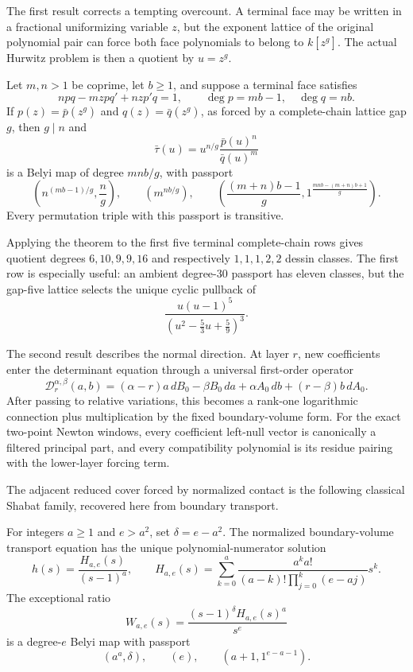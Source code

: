 \documentclass[11pt,reqno]{amsart}
\begin{document}
The first result corrects a tempting overcount.  A terminal face may be
written in a fractional uniformizing variable \(z\), but the exponent
lattice of the original polynomial pair can force both face polynomials to
belong to \(k[z^g]\).  The actual Hurwitz problem is then a quotient by
\(u=z^g\).

\begin{theorem}
\label{thm:intro-primary}
Let \(m,n>1\) be coprime, let \(b\ge1\), and suppose a terminal face satisfies
\[
npq-mzpq'+nzp'q=1,\qquad
\deg p=mb-1,\quad \deg q=nb.
\]
If \(p(z)=\bar p(z^g)\) and \(q(z)=\bar q(z^g)\), as forced by a
complete-chain lattice gap \(g\), then \(g\mid n\) and
\[
\bar\tau(u)=u^{n/g}\frac{\bar p(u)^n}{\bar q(u)^m}
\]
is a Belyi map of degree \(mnb/g\), with passport
\[
\left(n^{(mb-1)/g},\frac ng\right),\qquad
\left(m^{nb/g}\right),\qquad
\left(\frac{(m+n)b-1}{g},
1^{\frac{mnb-(m+n)b+1}{g}}\right).
\]
Every permutation triple with this passport is transitive.
\end{theorem}

Applying the theorem to the first five terminal complete-chain rows gives
quotient degrees \(6,10,9,9,16\) and respectively \(1,1,1,2,2\) dessin
classes.  The first row is especially useful: an ambient degree-\(30\)
passport has eleven classes, but the gap-five lattice selects the unique
cyclic pullback of
\[
\frac{u(u-1)^5}{(u^2-\frac53u+\frac59)^3}.
\]

The second result describes the normal direction.  At layer \(r\), new
coefficients enter the determinant equation through a universal first-order
operator
\[
\mathscr D_r^{\alpha,\beta}(a,b)
=(\alpha-r)a\,dB_0-\beta B_0\,da
+\alpha A_0\,db+(r-\beta)b\,dA_0.
\]
After passing to relative variations, this becomes a rank-one logarithmic
connection plus multiplication by the fixed boundary-volume form.  For the
exact two-point Newton windows, every coefficient left-null vector is
canonically a filtered principal part, and every compatibility polynomial
is its residue pairing with the lower-layer forcing term.

The adjacent reduced cover forced by normalized contact is the following
classical Shabat family, recovered here from boundary transport.

\begin{theorem}
\label{thm:intro-secondary}
For integers \(a\ge1\) and \(e>a^2\), set \(\delta=e-a^2\).  The normalized
boundary-volume transport equation has the unique polynomial-numerator
solution
\[
h(s)=\frac{H_{a,e}(s)}{(s-1)^a},
\qquad
H_{a,e}(s)=
\sum_{k=0}^a
\frac{a^k a!}{(a-k)!\prod_{j=0}^k(e-aj)}s^k.
\]
The exceptional ratio
\[
W_{a,e}(s)=\frac{(s-1)^\delta H_{a,e}(s)^a}{s^e}
\]
is a degree-\(e\) Belyi map with passport
\[
(a^a,\delta),\qquad(e),\qquad(a+1,1^{e-a-1}).
\]
\end{theorem}
\end{document}
